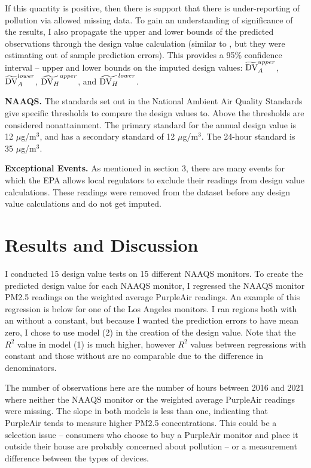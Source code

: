 \documentclass[12pt]{article}
\begin{document}
If this quantity is positive, then there is support that there is under-reporting of pollution via allowed missing data. To gain an understanding of significance of the results, I also propagate the upper and lower bounds of the predicted observations through the design value calculation (similar to \cite{fowlieBringingSatelliteBasedAir2019}, but they were estimating out of sample prediction errors). This provides a 95\% confidence interval -- upper and lower bounds on the imputed design values: $\widetilde{\text{DV}}_A^{upper}$,  $\widetilde{\text{DV}}_A^{lower}$, $\widetilde{\text{DV}_H}^{upper}$, and $\widetilde{\text{DV}_H}^{lower}$.

\textbf{NAAQS.} The standards set out in the National Ambient Air Quality Standards give specific thresholds to compare the design values to. Above the thresholds are considered nonattainment. The primary standard for the annual design value is 12 $\mu$g/m$^3$, and has a secondary standard of 12 $\mu$g/m$^3$. The 24-hour standard is 35 $\mu$g/m$^3$.


\textbf{Exceptional Events.} As mentioned in section 3, there are many events for which the EPA allows local regulators to exclude their readings from design value calculations. These readings were removed from the dataset before any design value calculations and do not get imputed.









\section{Results and Discussion}
\label{results}
I conducted 15 design value tests on 15 different NAAQS monitors. To create the predicted design value for each NAAQS monitor, I regressed the NAAQS monitor PM2.5 readings on the weighted average PurpleAir readings. An example of this regression is below for one of the Los Angeles monitors. I ran regions both with an without a constant, but because I wanted the prediction errors to have mean zero, I chose to use model (2) in the creation of the design value. Note that the $R^2$ value in model (1) is much higher, however $R^2$ values between regressions with constant and those without are no comparable due to the difference in denominators. 


The number of observations here are the number of hours between 2016 and 2021 where neither the NAAQS monitor or the weighted average PurpleAir readings were missing. The slope in both models is less than one, indicating that PurpleAir tends to measure higher PM2.5 concentrations. This could be a selection issue -- consumers who choose to buy a PurpleAir monitor and place it outside their house are probably concerned about pollution -- or a measurement difference between the types of devices.
\end{document}
